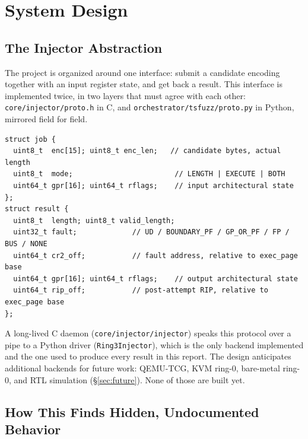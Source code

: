 \documentclass[11pt]{article}
\newcommand{\code}[1]{\texttt{#1}}
\begin{document}
\section{System Design}

\subsection{The Injector Abstraction}

The project is organized around one interface: submit a candidate
encoding together with an input register state, and get back a result.
This interface is implemented twice, in two layers that must agree with
each other: \code{core/injector/proto.h} in C, and
\code{orchestrator/tsfuzz/proto.py} in Python, mirrored field for field.

\begin{lstlisting}[style=hex]
struct job {
  uint8_t  enc[15]; uint8_t enc_len;   // candidate bytes, actual length
  uint8_t  mode;                        // LENGTH | EXECUTE | BOTH
  uint64_t gpr[16]; uint64_t rflags;    // input architectural state
};
struct result {
  uint8_t  length; uint8_t valid_length;
  uint32_t fault;             // UD / BOUNDARY_PF / GP_OR_PF / FP / BUS / NONE
  uint64_t cr2_off;           // fault address, relative to exec_page base
  uint64_t gpr[16]; uint64_t rflags;    // output architectural state
  uint64_t rip_off;           // post-attempt RIP, relative to exec_page base
};
\end{lstlisting}

A long-lived C daemon (\code{core/injector/injector}) speaks this
protocol over a pipe to a Python driver (\code{Ring3Injector}), which is
the only backend implemented and the one used to produce every result in
this report. The design anticipates additional backends for future work:
QEMU-TCG, KVM ring-0, bare-metal ring-0, and RTL simulation
(\S\ref{sec:future}). None of those are built yet.

\subsection{How This Finds Hidden, Undocumented Behavior}
\label{sec:engine}
\end{document}
